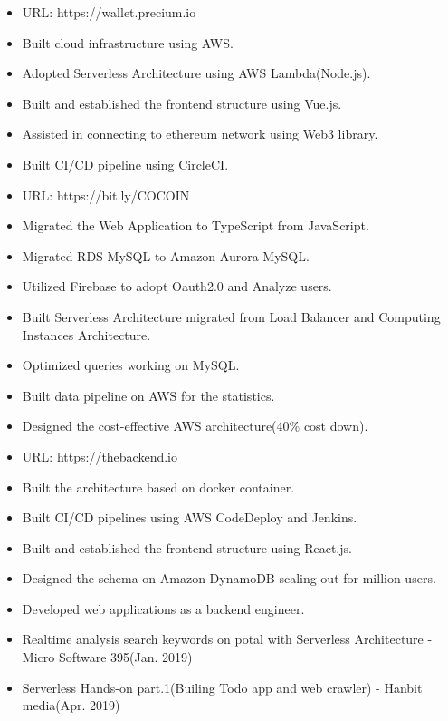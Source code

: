 


        \begin{itemize}
            \item URL: https://wallet.precium.io
            \item Built cloud infrastructure using AWS.
            \item Adopted Serverless Architecture using AWS Lambda(Node.js).
            \item Built and established the frontend structure using Vue.js.
            \item Assisted in connecting to ethereum network using Web3 library.
            \item Built CI/CD pipeline using CircleCI.
        \end{itemize}
    \smallskip
        \begin{itemize}
            \item URL: https://bit.ly/COCOIN
            \item Migrated the Web Application to TypeScript from JavaScript.
            \item Migrated RDS MySQL to Amazon Aurora MySQL.
            \item Utilized Firebase to adopt Oauth2.0 and Analyze users.
            \item Built Serverless Architecture migrated from Load Balancer and Computing Instances Architecture.
            \item Optimized queries working on MySQL.
            \item Built data pipeline on AWS for the statistics.
            \item Designed the cost-effective AWS architecture(40\% cost down).
        \end{itemize}
    \smallskip
        \begin{itemize}
            \item URL: https://thebackend.io
            \item Built the architecture based on docker container.
            \item Built CI/CD pipelines using AWS CodeDeploy and Jenkins.
            \item Built and established the frontend structure using React.js.
            \item Designed the schema on Amazon DynamoDB scaling out for million users.
            \item Developed web applications as a backend engineer.
        \end{itemize}
    \smallskip


    \begin{itemize}
        \item Realtime analysis search keywords on potal with Serverless Architecture - Micro Software 395(Jan. 2019)
        \item Serverless Hands-on part.1(Builing Todo app and web crawler) - Hanbit media(Apr. 2019)
    \end{itemize}
    \smallskip